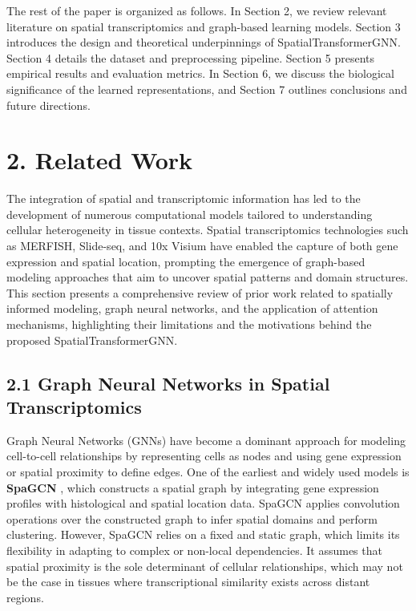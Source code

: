 \documentclass[unnumsec,webpdf,contemporary,medium]{oup-authoring-template}
\begin{document}
The rest of the paper is organized as follows. In Section 2, we review relevant literature on spatial transcriptomics and graph-based learning models. Section 3 introduces the design and theoretical underpinnings of SpatialTransformerGNN. Section 4 details the dataset and preprocessing pipeline. Section 5 presents empirical results and evaluation metrics. In Section 6, we discuss the biological significance of the learned representations, and Section 7 outlines conclusions and future directions.

\section*{2. Related Work}

The integration of spatial and transcriptomic information has led to the development of numerous computational models tailored to understanding cellular heterogeneity in tissue contexts. Spatial transcriptomics technologies such as MERFISH, Slide-seq, and 10x Visium have enabled the capture of both gene expression and spatial location, prompting the emergence of graph-based modeling approaches that aim to uncover spatial patterns and domain structures. This section presents a comprehensive review of prior work related to spatially informed modeling, graph neural networks, and the application of attention mechanisms, highlighting their limitations and the motivations behind the proposed SpatialTransformerGNN.

\subsection*{2.1 Graph Neural Networks in Spatial Transcriptomics}
Graph Neural Networks (GNNs) have become a dominant approach for modeling cell-to-cell relationships by representing cells as nodes and using gene expression or spatial proximity to define edges. One of the earliest and widely used models is \textbf{SpaGCN} \cite{spagcn}, which constructs a spatial graph by integrating gene expression profiles with histological and spatial location data. SpaGCN applies convolution operations over the constructed graph to infer spatial domains and perform clustering. However, SpaGCN relies on a fixed and static graph, which limits its flexibility in adapting to complex or non-local dependencies. It assumes that spatial proximity is the sole determinant of cellular relationships, which may not be the case in tissues where transcriptional similarity exists across distant regions.
\end{document}
